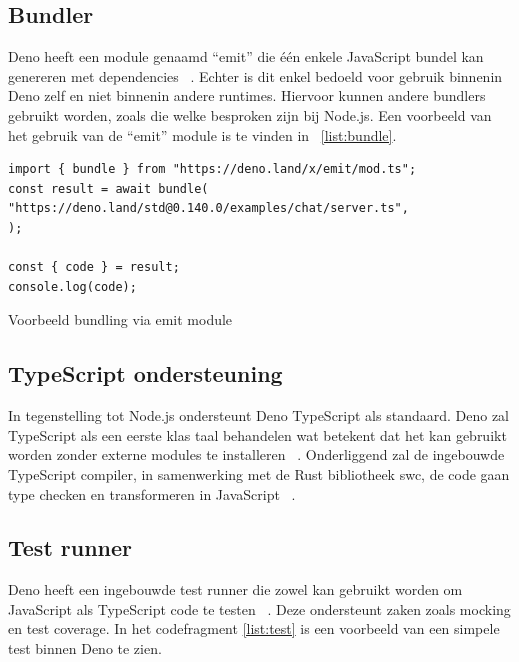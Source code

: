 \subsection{Bundler}
Deno heeft een module genaamd “emit” die één enkele JavaScript bundel kan genereren met dependencies ~\autocite{DenoLand2023a}. 
Echter is dit enkel bedoeld voor gebruik binnenin Deno zelf en niet binnenin andere runtimes. 
Hiervoor kunnen andere bundlers gebruikt worden, zoals die welke besproken zijn bij Node.js.
Een voorbeeld van het gebruik van de “emit” module is te vinden in ~\ref{list:bundle}.

\begin{listing}[H]
    \centering
    \begin{verbatim}
import { bundle } from "https://deno.land/x/emit/mod.ts";
const result = await bundle(
"https://deno.land/std@0.140.0/examples/chat/server.ts",
);

const { code } = result;
console.log(code);
        \end{verbatim}
        \caption[Bundling via emit module]{\label{list:bundle}Voorbeeld bundling via emit module  ~\autocite{DenoLand2023a}} 
\end{listing}
\subsection{TypeScript ondersteuning}
In tegenstelling tot Node.js ondersteunt Deno TypeScript als standaard. 
Deno zal TypeScript als een eerste klas taal behandelen wat betekent dat het kan gebruikt worden zonder externe modules te installeren ~\autocite{DenoLand2023}.
Onderliggend zal de ingebouwde TypeScript compiler, in samenwerking met de Rust bibliotheek swc, 
de code gaan type checken en transformeren in JavaScript ~\autocite{DenoLand2023}.

\subsection{Test runner}
Deno heeft een ingebouwde test runner die zowel kan gebruikt worden om JavaScript als TypeScript code te testen ~\autocite{DenoLand2023}.
Deze ondersteunt zaken zoals mocking en test coverage. In het codefragment \ref{list:test} is een voorbeeld van een simpele test binnen Deno te zien.

